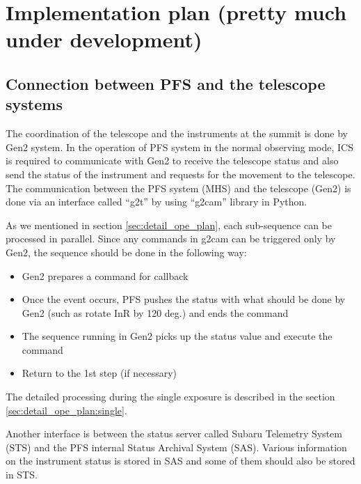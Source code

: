 \documentclass[a4paper]{article}
\begin{document}
\section{Implementation plan (pretty much under development)}
\subsection{Connection between PFS and the telescope systems}
The coordination of the telescope and the instruments at the summit is
done by Gen2 system. In the operation of PFS system in the normal
observing mode, ICS is required to communicate with Gen2 to receive
the telescope status and also send the status of the instrument and
requests for the movement to the telescope. The communication between
the PFS system (MHS) and the telescope (Gen2) is done via an interface
called ``g2t'' by using ``g2cam'' library in Python.

As we mentioned in section \ref{sec:detail_ope_plan}, each
sub-sequence can be processed in parallel. Since any commands in g2cam
can be triggered only by Gen2, the sequence should be done in the
following way:
\begin{itemize}
\item Gen2 prepares a command for callback
\item Once the event occurs, PFS pushes the status with what should be done by Gen2 (such as rotate InR by 120 deg.) and ends the command
\item The sequence running in Gen2 picks up the status value and execute the command
\item Return to the 1st step (if necessary)
\end{itemize}
The detailed processing during the single exposure is described in the section \ref{sec:detail_ope_plan:single}.

Another interface is between the status server called Subaru Telemetry
System (STS) and the PFS internal Status Archival System
(SAS). Various information on the instrument status is stored in SAS
and some of them should also be stored in STS.
\end{document}
